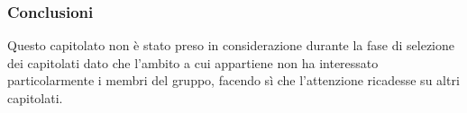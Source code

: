     \subsubsection{Conclusioni}
    Questo capitolato non è stato preso in considerazione durante la fase di selezione dei capitolati dato che l’ambito a cui appartiene non ha interessato particolarmente i membri del gruppo, facendo sì che l’attenzione ricadesse su altri capitolati.


